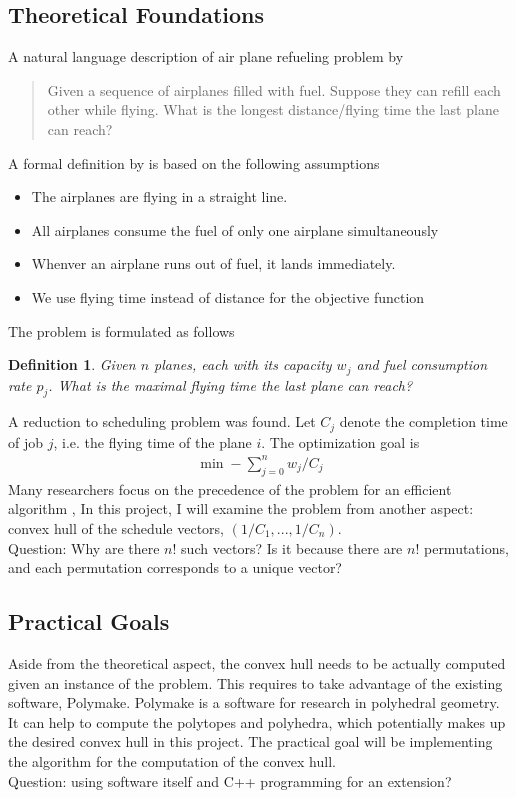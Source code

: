 \documentclass[12pt,letterpaper]{article}
\newtheorem{definition}[theorem]{Definition}
\begin{document}
\subsection{Theoretical Foundations}
A natural language description of air plane refueling problem by \cite{puzzle}
\begin{quotation}
    Given a sequence of airplanes filled with fuel. Suppose they can refill each other while flying.
    What is the longest distance/flying time the last plane can reach?
\end{quotation}
A formal definition by \cite{woeginger2010scheduling} is based on the following assumptions
\begin{itemize}
    \item The airplanes are flying in a straight line.
    \item All airplanes consume the fuel of only one airplane simultaneously
    \item Whenver an airplane runs out of fuel, it lands immediately.
    \item We use flying time instead of distance for the objective function
\end{itemize}
The problem is formulated as follows
\begin{definition}
    Given $n$ planes, each with its capacity $w_j$ and fuel consumption rate $p_j$. What is the maximal flying time the last plane can reach?
\end{definition}
A reduction to scheduling problem was found. Let $C_j$ denote the completion time of job $j$, i.e. the flying time of the plane $i$.
The optimization goal is 
\begin{align*}
    \min -\sum_{j=0}^n w_j / C_j
\end{align*}
Many researchers focus on the precedence of the problem for an efficient algorithm \cite{li2019fast} \cite{vasquez2015airplane},
In this project, I will examine the problem from another aspect: convex hull of the schedule vectors, $(1/C_1, ..., 1/C_n)$. \\
\color{red} Question: Why are there $n!$ such vectors? Is it because there are $n!$ permutations, and each permutation 
corresponds to a unique vector? \color{black}

\subsection{Practical Goals}
Aside from the theoretical aspect, the convex hull needs to be actually computed given an instance of the problem. 
This requires to take advantage of the existing software, Polymake. Polymake is a software for research in polyhedral geometry.
It can help to compute the polytopes and polyhedra, which potentially makes up the desired convex hull in this project. 
The practical goal will be implementing the algorithm for the computation of the convex hull. \\
\color{red} Question: using software itself and C++ programming for an extension?
\color{black}
\end{document}
